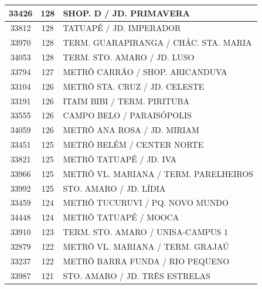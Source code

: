 \documentclass[
	12pt,				%
	oneside,			%
	a4paper,			%
	english,			%
	brazil				%
	]{abntex2ppgsi}
\begin{document}
\begin{apendicesenv}
\begin{longtable}{c|c|p{7cm}}
    33426 & 128   & SHOP. D / JD. PRIMAVERA \\
\hline

    33812 & 128   & TATUAPÉ / JD. IMPERADOR \\
\hline

    33970 & 128   & TERM. GUARAPIRANGA / CHÁC. STA. MARIA \\
\hline

    34053 & 128   & TERM. STO. AMARO / JD. LUSO \\
\hline

    33794 & 127   & METRÔ CARRÃO / SHOP. ARICANDUVA \\
\hline

    33104 & 126   & METRÔ STA. CRUZ / JD. CELESTE \\
\hline

    33191 & 126   & ITAIM BIBI / TERM. PIRITUBA \\
\hline

    33555 & 126   & CAMPO BELO / PARAISÓPOLIS \\
\hline

    34059 & 126   & METRÔ ANA ROSA / JD. MIRIAM \\
\hline

    33451 & 125   & METRÔ BELÉM      / CENTER NORTE \\
\hline

    33821 & 125   & METRÔ TATUAPÉ / JD. IVA \\
\hline

    33966 & 125   & METRÔ VL. MARIANA / TERM. PARELHEIROS \\
\hline

    33992 & 125   & STO. AMARO / JD. LÍDIA \\
\hline

    33459 & 124   & METRÔ TUCURUVI / PQ. NOVO MUNDO \\
\hline

    34448 & 124   & METRÔ TATUAPÉ / MOOCA \\
\hline

    33910 & 123   & TERM. STO. AMARO / UNISA-CAMPUS 1 \\
\hline

    32879 & 122   & METRÔ VL. MARIANA / TERM. GRAJAÚ \\
\hline

    33237 & 122   & METRÔ BARRA FUNDA / RIO PEQUENO \\
\hline

    33987 & 121   & STO. AMARO / JD. TRÊS ESTRELAS \\
\hline


\end{longtable}
\end{apendicesenv}
\end{document}
